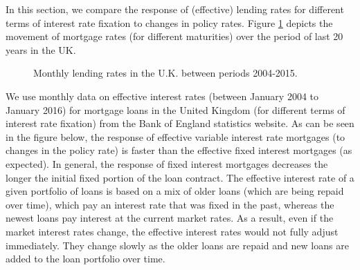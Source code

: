\documentclass[12pt]{article}
\numberwithin{equation}{section}
\begin{document}
In this section, we compare the response of (effective) lending rates for different terms of interest rate fixation to changes in policy rates. Figure \ref{lending_rates} depicts the movement of mortgage rates (for different maturities) over the period of last 20 years in the UK.
\begin{figure}[h!] 
	\caption{Monthly lending rates in the U.K. between periods 2004-2015.} 
	\label{lending_rates}
	\centering
	
\end{figure}



We use monthly data on effective interest rates (between January 2004 to January 2016)  for mortgage loans in the United Kingdom (for different terms of interest rate fixation) from the Bank of England statistics website. As can be seen in the figure below, the response of effective variable interest rate mortgages (to changes in the policy rate) is faster than the effective fixed interest mortgages (as expected). In general, the response of fixed interest mortgages decreases the longer the initial fixed portion of the loan contract.
The effective interest rate of a given portfolio of loans is based on a mix of older loans (which are being repaid over time), which pay an interest rate that was fixed in the past, whereas the newest loans pay interest at the current market rates. As a result, even if the market interest rates change, the effective interest rates would not fully adjust immediately. They change slowly as the older loans are repaid and new loans are added to the loan portfolio over time. 
\end{document}
